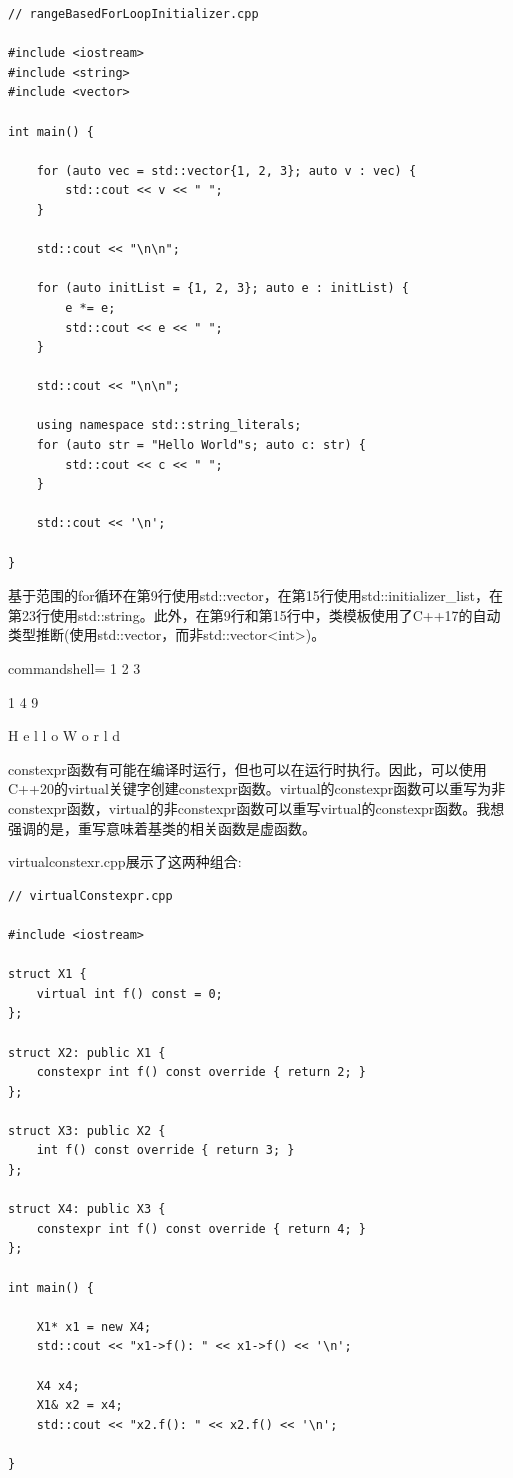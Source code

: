 \begin{lstlisting}[style=styleCXX]
// rangeBasedForLoopInitializer.cpp

#include <iostream>
#include <string>
#include <vector>

int main() {

	for (auto vec = std::vector{1, 2, 3}; auto v : vec) {
		std::cout << v << " ";
	}
	
	std::cout << "\n\n";
	
	for (auto initList = {1, 2, 3}; auto e : initList) {
		e *= e;
		std::cout << e << " ";
	}
	
	std::cout << "\n\n";
	
	using namespace std::string_literals;
	for (auto str = "Hello World"s; auto c: str) {
		std::cout << c << " ";
	}
	
	std::cout << '\n';

}
\end{lstlisting}

基于范围的for循环在第9行使用std::vector，在第15行使用std::initializer\_list，在第23行使用std::string。此外，在第9行和第15行中，类模板使用了C++17的自动类型推断(使用std::vector，而非std::vector<int>)。

\begin{tcblisting}{commandshell={}}
1 2 3

1 4 9

H e l l o  W o r l d
\end{tcblisting}


constexpr函数有可能在编译时运行，但也可以在运行时执行。因此，可以使用C++20的virtual关键字创建constexpr函数。virtual的constexpr函数可以重写为非constexpr函数，virtual的非constexpr函数可以重写virtual的constexpr函数。我想强调的是，重写意味着基类的相关函数是虚函数。

virtualconstexr.cpp展示了这两种组合:

\begin{lstlisting}[style=styleCXX]
// virtualConstexpr.cpp

#include <iostream>

struct X1 {
	virtual int f() const = 0;
};

struct X2: public X1 {
	constexpr int f() const override { return 2; }
};

struct X3: public X2 {
	int f() const override { return 3; }
};

struct X4: public X3 {
	constexpr int f() const override { return 4; }
};

int main() {
	
	X1* x1 = new X4;
	std::cout << "x1->f(): " << x1->f() << '\n';
	
	X4 x4;
	X1& x2 = x4;
	std::cout << "x2.f(): " << x2.f() << '\n';

}
\end{lstlisting}

